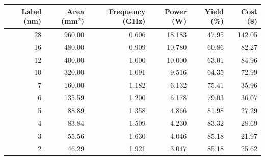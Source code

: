 \begin{tabular}{rrrrrr}
\toprule
Label (nm) & Area (mm$^2$) & Frequency (GHz) & Power (W) & Yield (\%) & Cost (\$)\\
\midrule
28 & 960.00 & 0.606 & 18.183 & 47.95 & 142.05 \\
16 & 480.00 & 0.909 & 10.780 & 60.86 & 82.27 \\
12 & 400.00 & 1.000 & 10.000 & 63.01 & 84.96 \\
10 & 320.00 & 1.091 & 9.516 & 64.35 & 72.99 \\
7 & 160.00 & 1.182 & 6.132 & 75.41 & 35.96 \\
6 & 135.59 & 1.200 & 6.178 & 79.03 & 36.07 \\
5 & 88.89 & 1.358 & 4.866 & 81.98 & 27.29 \\
4 & 83.84 & 1.509 & 4.230 & 83.32 & 28.69 \\
3 & 55.56 & 1.630 & 4.046 & 85.18 & 21.97 \\
2 & 46.29 & 1.921 & 3.047 & 85.18 & 25.62 \\
\bottomrule
\end{tabular}
